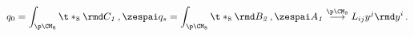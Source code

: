 \begin{equation}
q_0=\int_{\p \CM_8} \t*_8 \rmd C_{\it 1} \,, \zespai q_s=\int_{\p \CM_8}
\t*_8 \rmd B_{\it 2} \,, \zespai A_{\it 1}
 \stackrel{\p \CM_8}{\longrightarrow}L_{ij}y^j \rmd y^i \,.
\end{equation}

